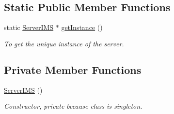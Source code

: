 \subsection*{Static Public Member Functions}
\begin{DoxyCompactItemize}
\item 
\hypertarget{classServerIMS_a1697fe8f8e0516d4fe0b5d973666e8b7}{
static \hyperlink{classServerIMS}{ServerIMS} $\ast$ \hyperlink{classServerIMS_a1697fe8f8e0516d4fe0b5d973666e8b7}{getInstance} ()}
\label{classServerIMS_a1697fe8f8e0516d4fe0b5d973666e8b7}

\begin{DoxyCompactList}\small\item\em To get the unique instance of the server. \item\end{DoxyCompactList}\end{DoxyCompactItemize}
\subsection*{Private Member Functions}
\begin{DoxyCompactItemize}
\item 
\hypertarget{classServerIMS_afb5ed9ac797a8f96baeef7b1ca8614d3}{
\hyperlink{classServerIMS_afb5ed9ac797a8f96baeef7b1ca8614d3}{ServerIMS} ()}
\label{classServerIMS_afb5ed9ac797a8f96baeef7b1ca8614d3}

\begin{DoxyCompactList}\small\item\em Constructor, private because class is singleton. \item\end{DoxyCompactList}\end{DoxyCompactItemize}
